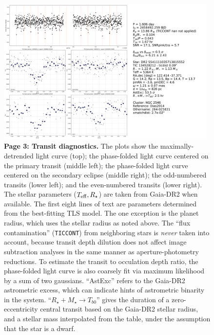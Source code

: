 \documentclass[12pt,twocolumn,tighten]{aastex62}
\begin{document}
\begin{figure}[!h]
	\begin{center}
		\leavevmode
		\includegraphics[width=0.98\textwidth]{gaiatwo0005541111035713815552-0007_page03.pdf}
	\end{center}
	\vspace{-0.5cm}
	\caption{
		{\bf Page 3: Transit diagnostics.} The plots show the maximally-detrended
		light curve (top); the phase-folded light curve centered on the primary transit
		(middle left); the phase-folded light curve centered on the secondary eclipse
		(middle right); the odd-numbered transits (lower left); and the
		even-numbered transits (lower right).
		The stellar parameters ($T_{\rm eff}, R_\star$) are taken from Gaia-DR2 
		when available.
		The first eight lines of text are parameters determined 
		from the best-fitting TLS model.
		The one exception is the planet radius, which uses the stellar radius
		as noted above.
		The ``flux contamination'' (\texttt{TICCONT}) from neighboring stars
		is {\it never} taken into account, because transit depth dilution does
		not affect image subtraction analyses in the same manner as 
		aperture-photometry reductions.
		To estimate the transit to occulation
		depth ratio,
		the phase-folded light curve is also coarsely fit via maximum likelihood
		by a sum of two gaussians.
		``AstExc'' refers to the Gaia-DR2 astrometric excess, which can indicate
		hints of astrometric binarity in the system.
		``$R_\star + M_\star \rightarrow T_{b0}$'' gives the duration of a 
		zero-eccentricity central transit based on the Gaia-DR2 stellar radius,
		and a stellar mass interpolated from the \citet{pecaut_intrinsic_2013} table,
		under the assumption that the star is a dwarf.%
		\label{fig:pg3}
	}
\end{figure}
\end{document}
